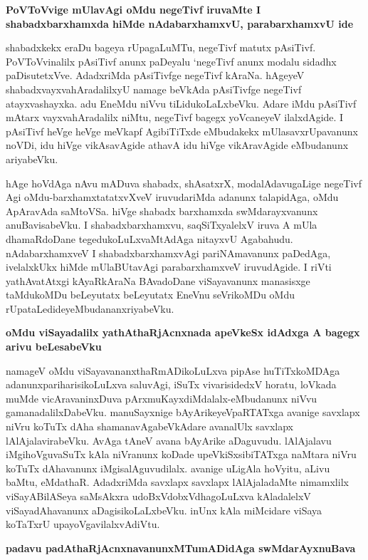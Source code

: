 {\bigskip
\noindent
{\large\bf PoVToVvige mUlavAgi oMdu negeTivf iruvaMte I shabadxbarxhamxda hiMde nAdabarxhamxvU, para\-barxhamxvU ide}}\label{page199}
\medskip

\noindent
shabadxkekx eraDu bageya rUpagaLuMTu, negeTivf matutx pAsiTivf. PoVToVvinalilx pAsiTivf anunx paDeyalu `negeTivf anunx modalu sidadhx paDisutetxVve. AdadxriMda pAsiTivfge negeTivf kAraNa. hAgeyeV shabadx\-vayxvahAradalilxyU namage beVkAda pAsiTivfge negeTivf atayxvashayxka. adu EneMdu niVvu tiLidu\-koLaLx\-beVku. Adare iMdu pAsiTivf mAtarx vayxvahAradalilx niMtu, negeTivf bagegx yoVcaneyeV ilalxdA\-gide. I pAsi\-Tivf heVge heVge meVkapf AgibiTiTxde eMbudakekx mUlasavxrUpavanunx noVDi, idu hiVge vikAsa\-vAgide athavA idu hiVge vikAravAgide eMbudanunx ariyabeVku. 

hAge hoVdAga nAvu mADuva shabadx, shAsatxrX, modalAdavugaLige negeTivf Agi oMdu-barxhamxtatatxvXveV iruvudariMda adanunx talapi\-dAga, oMdu ApAravAda saMtoVSa. hiVge shabadx barxhamxda swMdarayxvanunx anuBavisabeVku. I shabadx\-barxhamxvu, saqSiTxyalelxV iruva A mUla dhamaRdoDane tegedukoLuLxvaMtAdAga nitayxvU Agabahudu. nAda\-barxhamxveV I shabadxbarxhamxvAgi pariNAmavanunx paDedAga, ivelalxkUkx hiMde mUlaBUtavAgi para\-barxhamxveV iruvudAgide. I riVti yathAvatAtxgi kAyaRkAraNa BAvadoDane viSayavanunx manasisxge taMdu\-koMDu beLeyutatx beLeyutatx EneVnu seVrikoMDu oMdu rUpataLedideyeMbudananxriyabeVku.

{\bigskip
\noindent
{\large\bf oMdu viSayadalilx yathAthaRjAcnxnada apeVkeSx idAdxga A bagegx arivu beLesabeVku}}\label{page200}
\medskip

\noindent
namageV oMdu viSayavananxthaRmADikoLuLxva pipAse huTiTxkoMDAga adanunx\break pariharisikoLuLxva saluvAgi, iSuTx vivarisidedxV horatu, loVkada muMde vicAra\-vaninxDuva pArxmuKayxdiMdalalx-eMbu\-danunx niVvu gamanadalilxDabeVku. manuSayxnige bAyArikeyeVpaRTATxga avanige savxlapx niVru koTuTx dAha shamana\-vAgabeVkAdare avanalUlx savxlapx lAlAjalavirabeVku. AvAga tAneV avana bAyArike aDagu\-vudu. lAlAjalavu iMgihoVguvaSuTx kAla niVranunx koDade upeVkiSxsibiTATxga naMtara niVru koTuTx dAha\-vanunx iMgisalAguvudilalx. avanige uLigAla hoVyitu, aLivu baMtu, eMdathaR. AdadxriMda savxlapx savxlapx lAlAjaladaMte nimamxlilx viSayABilASeya saMsAkxra udoBxVdobxVdhagoLuLxva kAladalelxV viSayadAha\-vanunx aDagisikoLaLxbeVku. inUnx kAla miMcidare viSaya koTaTxrU upayoVgavilalxvAdiVtu.

\eject

{\bigskip
\noindent
{\large\bf padavu padAthaRjAcnxnavanunxMTumADidAga swMdarAyxnuBava}}\label{page201}
\medskip

